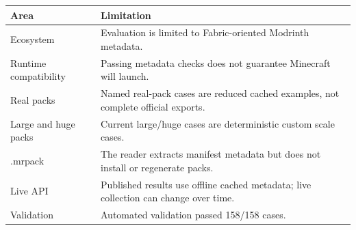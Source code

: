 \begin{tabular}{ll}
\hline
Area & Limitation \\
\hline
Ecosystem & Evaluation is limited to Fabric-oriented Modrinth metadata. \\
Runtime compatibility & Passing metadata checks does not guarantee Minecraft will launch. \\
Real packs & Named real-pack cases are reduced cached examples, not complete official exports. \\
Large and huge packs & Current large/huge cases are deterministic custom scale cases. \\
.mrpack & The reader extracts manifest metadata but does not install or regenerate packs. \\
Live API & Published results use offline cached metadata; live collection can change over time. \\
Validation & Automated validation passed 158/158 cases. \\
\hline
\end{tabular}
